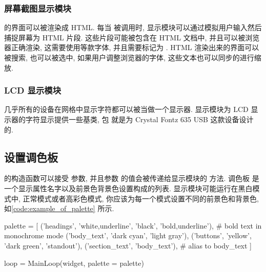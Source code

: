 \subsubsection[Screenshot 显示模块 html\_fragment]{屏幕截图显示模块 }
\indent\urwid{} 的界面可以被渲染成 HTML. 每当  被调用时,  显示模块可以通过模拟用户输入然后捕捉屏幕为 HTML 片段. 这些片段可能被包含在 HTML 文档中, 并且可以被浏览器正确渲染, 这需要使用等款字体, 并且需要标记为 . HTML 渲染出来的界面可以被搜索, 也可以被选中, 如果用户调整浏览器的字体, 这些文本也可以同步的进行缩放.

\subsubsection[LCD 显示模块 lcd\_display]{LCD 显示模块 }
几乎所有的设备在网格中显示字符都可以被当做一个显示器.  显示模块为 LCD 显示器的字符显示提供一些基类, 包  就是为 Crystal Fontz 635 USB 这款设备设计的.

\subsection{设置调色板}
\indent{} 的构造函数可以接受  参数, 并且参数  的值会被传递给显示模块的  方法. 调色板  是一个显示属性名字以及前景色背景色设置构成的列表. 显示模块可能运行在黑白模式中, 正常模式或者高彩色模式, 你应该为每一个模式设置不同的前景色和背景色, 如\cref{code:example_of_palette} 所示.

\begin{codebox}[
  caption = 调色板举例,
  label = code:example_of_palette
]
palette = [
    ('headings', 'white,underline', 'black', 'bold,underline'), # bold text in monochrome mode
    ('body_text', 'dark cyan', 'light gray'),
    ('buttons', 'yellow', 'dark green', 'standout'),
    ('section_text', 'body_text'), # alias to body_text
]

loop = MainLoop(widget, palette = palette)
\end{codebox}
